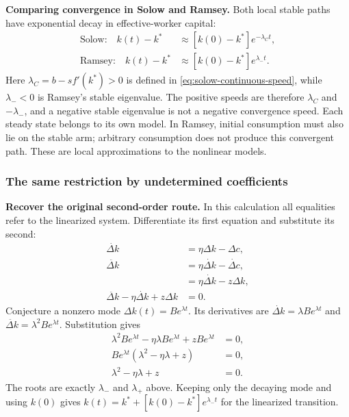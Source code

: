 \begin{greenblock}
\textbf{Comparing convergence in Solow and Ramsey.}
Both local stable paths have exponential decay in effective-worker capital:
\[
\begin{aligned}
\text{Solow:}\quad k(t)-k^*&\approx[k(0)-k^*]e^{-\lambda_Ct},\\
\text{Ramsey:}\quad k(t)-k^*&\approx[k(0)-k^*]e^{\lambda_-t}.
\end{aligned}
\]
Here $\lambda_C=b-sf'(k^*)>0$ is defined in
\eqref{eq:solow-continuous-speed}, while $\lambda_-<0$ is Ramsey's stable
eigenvalue. The positive speeds are therefore $\lambda_C$ and $-\lambda_-$,
and a negative stable eigenvalue is not a negative convergence speed. Each steady state belongs to
its own model. In Ramsey, initial consumption must also lie on the stable
arm; arbitrary consumption does not produce this convergent path. These are
local approximations to the nonlinear models.
\end{greenblock}

\subsubsection{The same restriction by undetermined coefficients}

\textbf{Recover the original second-order route.}
In this calculation all equalities refer to the linearized system. Differentiate
its first equation and substitute its second:
\begin{align}
\dot{\Delta k}&=\eta\Delta k-\Delta c,\\
\ddot{\Delta k}&=\eta\dot{\Delta k}-\dot{\Delta c},\\
 &=\eta\dot{\Delta k}-z\Delta k,\\
\ddot{\Delta k}-\eta\dot{\Delta k}+z\Delta k&=0.
\end{align}
Conjecture a nonzero mode $\Delta k(t)=Be^{\lambda t}$. Its derivatives are
$\dot{\Delta k}=\lambda Be^{\lambda t}$ and
$\ddot{\Delta k}=\lambda^2Be^{\lambda t}$. Substitution gives
\begin{align}
\lambda^2Be^{\lambda t}-\eta\lambda Be^{\lambda t}
      +zBe^{\lambda t}&=0,\\
Be^{\lambda t}(\lambda^2-\eta\lambda+z)&=0,\\
\lambda^2-\eta\lambda+z&=0.
\end{align}
The roots are exactly $\lambda_-$ and $\lambda_+$ above. Keeping only the
decaying mode and using $k(0)$ gives
$k(t)=k^*+[k(0)-k^*]e^{\lambda_-t}$ for the linearized transition.

